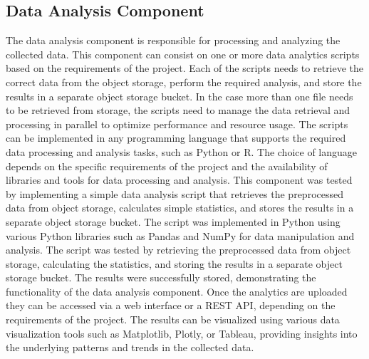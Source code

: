 \subsection{Data Analysis Component}
The data analysis component is responsible for processing and analyzing the collected data. This component can consist on one or more data analytics scripts based on the requirements of the project. Each of the scripts needs to retrieve the correct data from the object storage, perform the required analysis, and store the results in a separate object storage bucket. In the case more than one file needs to be retrieved from storage, the scripts need to manage the data retrieval and processing in parallel to optimize performance and resource usage. The scripts can be implemented in any programming language that supports the required data processing and analysis tasks, such as Python or R. The choice of language depends on the specific requirements of the project and the availability of libraries and tools for data processing and analysis.
This component was tested by implementing a simple data analysis script that retrieves the preprocessed data from object storage, calculates simple statistics, and stores the results in a separate object storage bucket. The script was implemented in Python using various Python libraries such as Pandas and NumPy for data manipulation and analysis. The script was tested by retrieving the preprocessed data from object storage, calculating the statistics, and storing the results in a separate object storage bucket. The results were successfully stored, demonstrating the functionality of the data analysis component.
Once the analytics are uploaded they can be accessed via a web interface or a REST API, depending on the requirements of the project. The results can be visualized using various data visualization tools such as Matplotlib, Plotly, or Tableau, providing insights into the underlying patterns and trends in the collected data.